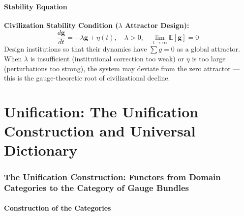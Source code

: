 \documentclass[12pt,a4paper]{article}
\theoremstyle{plain}
\theoremstyle{definition}
\newcommand{\E}{\mathbb{E}}
\newcommand{\gv}{\mathbf{g}}
\begin{document}
\subsection{Stability Equation}

\begin{keyeq}
\textbf{Civilization Stability Condition ($\lambda$ Attractor Design):}
\begin{equation}
    \boxed{\frac{d\gv}{dt} = -\lambda \gv + \eta(t), \quad \lambda > 0, \quad \lim_{t \to \infty} \E[\gv] = 0}
\end{equation}
Design institutions so that their dynamics have $\sum g = 0$ as a global attractor.
When $\lambda$ is insufficient (institutional correction too weak) or $\eta$ is too large (perturbations too strong),
the system may deviate from the zero attractor — this is the gauge-theoretic root of civilizational decline.
\end{keyeq}

\newpage


\part{Unification: The Unification Construction and Universal Dictionary}


\section{The Unification Construction: Functors from Domain Categories to the Category of Gauge Bundles}

\subsection{Construction of the Categories}
\end{document}
